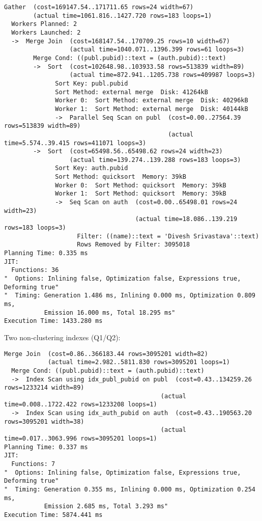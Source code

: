 \documentclass[11pt]{scrartcl}
\begin{document}
  {\small
\parskip0pt\begin{verbatim}
Gather  (cost=169147.54..171711.65 rows=24 width=67)
        (actual time=1061.816..1427.720 rows=183 loops=1)
  Workers Planned: 2
  Workers Launched: 2
  ->  Merge Join  (cost=168147.54..170709.25 rows=10 width=67)
                  (actual time=1040.071..1396.399 rows=61 loops=3)
        Merge Cond: ((publ.pubid)::text = (auth.pubid)::text)
        ->  Sort  (cost=102648.98..103933.58 rows=513839 width=89)
                  (actual time=872.941..1205.738 rows=409987 loops=3)
              Sort Key: publ.pubid
              Sort Method: external merge  Disk: 41264kB
              Worker 0:  Sort Method: external merge  Disk: 40296kB
              Worker 1:  Sort Method: external merge  Disk: 40144kB
              ->  Parallel Seq Scan on publ  (cost=0.00..27564.39 rows=513839 width=89)
                                             (actual time=5.574..39.415 rows=411071 loops=3)
        ->  Sort  (cost=65498.56..65498.62 rows=24 width=23)
                  (actual time=139.274..139.288 rows=183 loops=3)
              Sort Key: auth.pubid
              Sort Method: quicksort  Memory: 39kB
              Worker 0:  Sort Method: quicksort  Memory: 39kB
              Worker 1:  Sort Method: quicksort  Memory: 39kB
              ->  Seq Scan on auth  (cost=0.00..65498.01 rows=24 width=23)
                                    (actual time=18.086..139.219 rows=183 loops=3)
                    Filter: ((name)::text = 'Divesh Srivastava'::text)
                    Rows Removed by Filter: 3095018
Planning Time: 0.335 ms
JIT:
  Functions: 36
"  Options: Inlining false, Optimization false, Expressions true, Deforming true"
"  Timing: Generation 1.486 ms, Inlining 0.000 ms, Optimization 0.809 ms,
           Emission 16.000 ms, Total 18.295 ms"
Execution Time: 1433.280 ms

\end{verbatim}}

Two non-clustering indexes (Q1/Q2):

  {\small
\parskip0pt\begin{verbatim}
Merge Join  (cost=0.86..366183.44 rows=3095201 width=82)
            (actual time=2.982..5811.830 rows=3095201 loops=1)
  Merge Cond: ((publ.pubid)::text = (auth.pubid)::text)
  ->  Index Scan using idx_publ_pubid on publ  (cost=0.43..134259.26 rows=1233214 width=89)
                                           (actual time=0.008..1722.422 rows=1233208 loops=1)
  ->  Index Scan using idx_auth_pubid on auth  (cost=0.43..190563.20 rows=3095201 width=38)
                                           (actual time=0.017..3063.996 rows=3095201 loops=1)
Planning Time: 0.337 ms
JIT:
  Functions: 7
"  Options: Inlining false, Optimization false, Expressions true, Deforming true"
"  Timing: Generation 0.355 ms, Inlining 0.000 ms, Optimization 0.254 ms,
           Emission 2.685 ms, Total 3.293 ms"
Execution Time: 5874.441 ms
\end{verbatim}}
\end{document}
